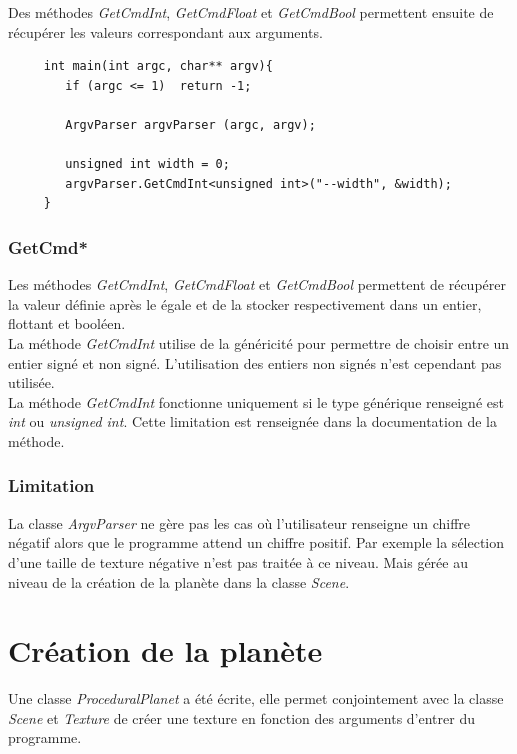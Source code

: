   Des méthodes \textit{GetCmdInt}, \textit{GetCmdFloat} et \textit{GetCmdBool} permettent ensuite de récupérer les valeurs correspondant aux arguments.
  
  \lstset{language=C++}
  \begin{lstlisting}
     int main(int argc, char** argv){
        if (argc <= 1)  return -1;
        
        ArgvParser argvParser (argc, argv);
        
        unsigned int width = 0;
        argvParser.GetCmdInt<unsigned int>("--width", &width);
     }
  \end{lstlisting}
  
   \subsubsection{GetCmd*}
    Les méthodes \textit{GetCmdInt}, \textit{GetCmdFloat} et \textit{GetCmdBool} permettent de récupérer la valeur définie après le égale et de la stocker respectivement dans un entier, flottant et booléen.\\
    
    La méthode \textit{GetCmdInt} utilise de la généricité pour permettre de choisir entre un entier signé et non signé. L'utilisation des entiers non signés n'est cependant pas utilisée.\\
    
    La méthode \textit{GetCmdInt} fonctionne uniquement si le type générique renseigné est \textit{int} ou \textit{unsigned int}. Cette limitation est renseignée dans la documentation de la méthode.
    
  \subsubsection{Limitation}
    
    La classe \textit{ArgvParser} ne gère pas les cas où l'utilisateur renseigne un chiffre négatif alors que le programme attend un chiffre positif. Par exemple la sélection d'une taille de texture négative
    n'est pas traitée à ce niveau. Mais gérée au niveau de la création de la planète dans la classe \textit{Scene}.
  
  \section{Création de la planète}
  Une classe \textit{ProceduralPlanet} a été écrite, elle permet conjointement avec la classe \textit{Scene} et \textit{Texture} de créer une texture en fonction des arguments d'entrer du programme.
  
